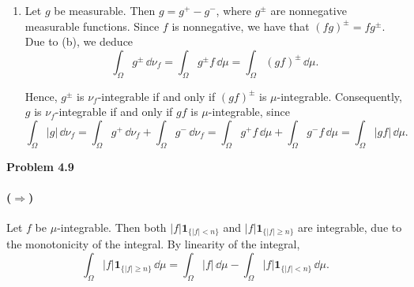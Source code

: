 \begin{enumerate}[label={(\alph*)}]
{		} 
		
	Following the hint, we start by considering nonnegative simple functions $g$. Suppose $g=\sum_{i=1}^n a_i \mathbf{1}_{A_i}$ for $a_i\in\bbR$ and $A_i\in\cF$ mutually disjoint. Then,
	\[
		\int_\Omega g\,d\nu_f = \sum_{i=1}^n a_i \,\nu_f(A_i) = \sum_{i=1}^n a_i\int_{A_i} f\,\dd\mu = \int_\Omega gf\,\dd\mu.
	\]
	
	Now let $g$ be a nonnegative measurable function and $[g]_n$ be a sequence of nonnegative simple functions that converge pointwise monotonically to $g$. Then MCT yields
	\[
		\int_\Omega g\,\dd\nu_f = \lim_{n\to\infty}\int_\Omega [g]_n\,\dd\nu_f = \lim_{n\to\infty} \int_\Omega [g]_n f\,\dd\mu = \int_\Omega gf\,\dd\mu,
	\]
	where we used the fact that $[g]_n f$ converges pointwise monotonically to $gf$.
	
	\item {} 
		
	Let $g$ be measurable. Then $g=g^+-g^-$, where $g^\pm$ are nonnegative measurable functions. Since $f$ is nonnegative, we have that $(fg)^\pm = f g^\pm$. Due to (b), we deduce
	\[
		\int_\Omega g^\pm\,\dd\nu_f = \int_\Omega g^\pm f\,\dd\mu = \int_\Omega (gf)^\pm\,\dd\mu.
	\]
	
	Hence, $g^\pm$ is $\nu_f$-integrable if and only if $(gf)^\pm$ is $\mu$-integrable. Consequently, $g$ is $\nu_f$-integrable if and only if $gf$ is $\mu$-integrable, since
	\[
		\int_\Omega |g|\,\dd\nu_f = \int_\Omega g^+\,\dd\nu_f + \int_\Omega g^-\,\dd\nu_f = \int_\Omega g^+f\,\dd\mu + \int_\Omega g^-f\,\dd\mu = \int_\Omega |gf|\,\dd\mu.
	\]
\end{enumerate}

\bigskip
\textbf{Problem 4.9}

\paragraph{($\Rightarrow$)} %
Let $f$ be $\mu$-integrable. Then both $|f|\mathbf{1}_{\{|f|<n\}}$ and $|f|\mathbf{1}_{\{|f|\ge n\}}$ are integrable, due to the monotonicity of the integral. By linearity of the integral,
\[
	\int_\Omega |f|\mathbf{1}_{\{|f|\ge n\}}\,\dd\mu = \int_\Omega |f|\,\dd\mu - \int_\Omega |f|\mathbf{1}_{\{|f|< n\}}\,\dd\mu.
\]

